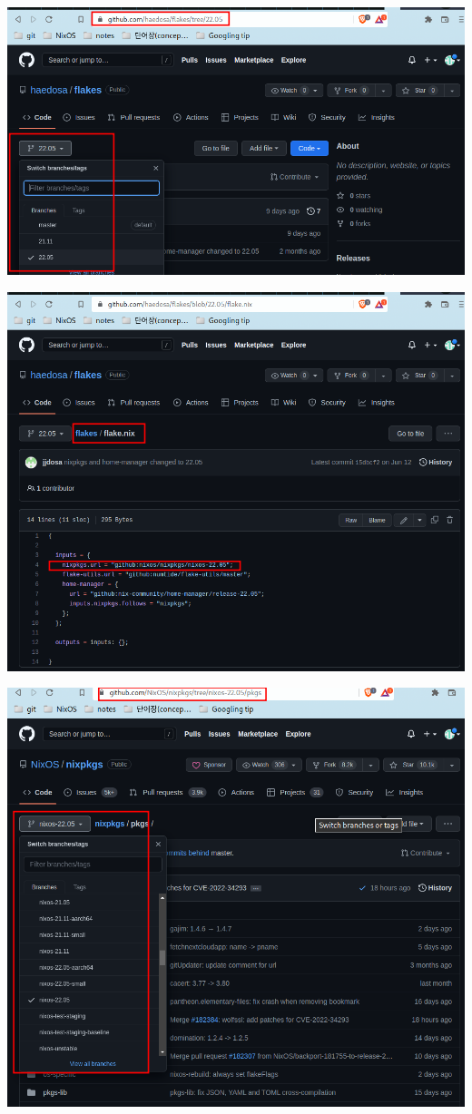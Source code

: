 \documentclass[a4paper,11pt]{article}
\begin{document}
\begin{center}
\includegraphics[width=.9\linewidth]{./img/3_nix/real repo flake indicate.png}
\end{center}
\begin{center}
\includegraphics[width=.9\linewidth]{./img/3_nix/real repo flake indicate_2.png}
\end{center}
\begin{center}
\includegraphics[width=.9\linewidth]{./img/3_nix/real repo flake indicate_3.png}
\end{center}
\end{document}
